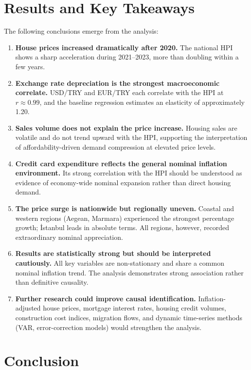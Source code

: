 \documentclass[
  11pt,
  a4paper,
]{article}
\begin{document}
\section{Results and Key Takeaways}\label{sec-results}

The following conclusions emerge from the analysis:

\begin{enumerate}
\def\labelenumi{\arabic{enumi}.}
\item
  \textbf{House prices increased dramatically after 2020.} The national
  HPI shows a sharp acceleration during 2021--2023, more than doubling
  within a few years.
\item
  \textbf{Exchange rate depreciation is the strongest macroeconomic
  correlate.} USD/TRY and EUR/TRY each correlate with the HPI at
  \(r \approx 0.99\), and the baseline regression estimates an
  elasticity of approximately 1.20.
\item
  \textbf{Sales volume does not explain the price increase.} Housing
  sales are volatile and do not trend upward with the HPI, supporting
  the interpretation of affordability-driven demand compression at
  elevated price levels.
\item
  \textbf{Credit card expenditure reflects the general nominal inflation
  environment.} Its strong correlation with the HPI should be understood
  as evidence of economy-wide nominal expansion rather than direct
  housing demand.
\item
  \textbf{The price surge is nationwide but regionally uneven.} Coastal
  and western regions (Aegean, Marmara) experienced the strongest
  percentage growth; İstanbul leads in absolute terms. All regions,
  however, recorded extraordinary nominal appreciation.
\item
  \textbf{Results are statistically strong but should be interpreted
  cautiously.} All key variables are non-stationary and share a common
  nominal inflation trend. The analysis demonstrates strong association
  rather than definitive causality.
\item
  \textbf{Further research could improve causal identification.}
  Inflation-adjusted house prices, mortgage interest rates, housing
  credit volumes, construction cost indices, migration flows, and
  dynamic time-series methods (VAR, error-correction models) would
  strengthen the analysis.
\end{enumerate}

\section{Conclusion}\label{conclusion}
\end{document}
